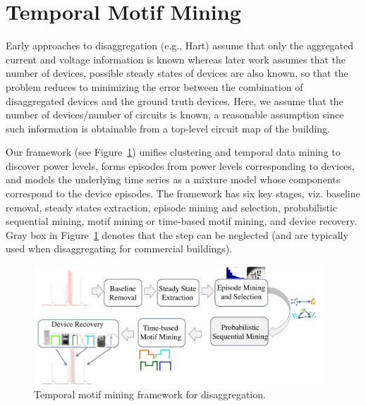 %

\section{Temporal Motif Mining}
Early approaches to disaggregation (e.g., Hart\cite{hart1992})
assume that only the
aggregated current and voltage information is known whereas
later work assumes that the number of devices, possible steady states
of devices are also known,
so that the problem reduces to minimizing the error between
the combination of disaggregated devices and the ground truth devices.
Here, we assume that the number of devices/number of circuits is known,
a reasonable assumption since such information is obtainable from a top-level
circuit map of the building.

%
Our framework (see Figure~\ref{fig_fw})
unifies clustering and temporal data mining
to discover power levels,
forms episodes from power levels corresponding to devices,
and models the underlying time series as a mixture model whose components
correspond to the device episodes.
The framework has six key stages, viz.
baseline removal,
steady states extraction,
episode mining and selection,
probabilistic sequential mining,
motif mining or time-based motif mining, and
device recovery.
Gray box in Figure~\ref{fig_fw} denotes that the step can be neglected
(and are typically used when disaggregating for commercial buildings).

\begin{figure}[!hbtp]
\centering
\includegraphics[width=0.97\textwidth]{disaggfigs/arch.pdf}
\caption {Temporal motif mining framework for disaggregation.}
\label{fig_fw}
\end{figure}

